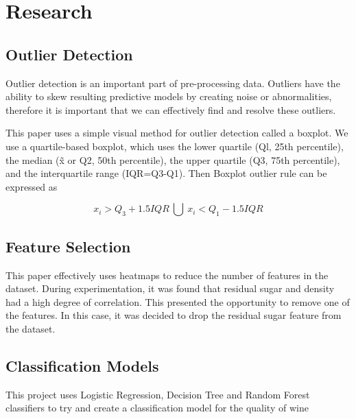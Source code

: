 \section{Research}

\subsection{Outlier Detection}

Outlier detection is an important part of pre-processing data. Outliers have the ability to skew resulting predictive models by creating noise or abnormalities, therefore it is important that we can effectively find and resolve these outliers.

This paper uses a simple visual method for outlier detection called a boxplot.
We use a quartile-based boxplot, which uses the lower quartile (Ql, 25th percentile), the median (x̃  or Q2, 50th percentile), the upper quartile (Q3, 75th percentile), and the interquartile range (IQR=Q3-Q1). Then Boxplot outlier rule can be expressed as\cite{6520712}

\begin{equation}
x_{i} > Q_{3}+1.5IQR\ \bigcup \ x_{i} < Q_{1}-1.5IQR
\end{equation}

\subsection{Feature Selection}

This paper effectively uses heatmaps to reduce the number of features in the dataset. During experimentation, it was found that residual sugar and density had a high degree of correlation. This presented the opportunity to remove one of the features. In this case, it was decided to drop the residual sugar feature from the dataset.

\subsection{Classification Models}

This project uses Logistic Regression, Decision Tree and Random Forest classifiers to try and create a classification model for the quality of wine

